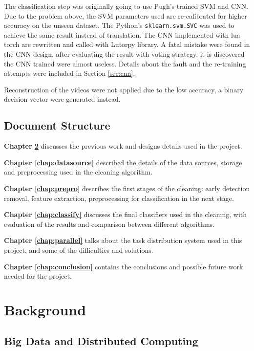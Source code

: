 \documentclass[bsc,logo,twoside,fullspacing,parskip]{infthesis}
\begin{document}
The classification step was originally going to use Pugh's trained SVM and CNN. Due to the problem above, the SVM parameters used are re-calibrated for higher accuracy on the unseen dataset. 
The Python's {\tt sklearn.svm.SVC} was used to achieve the same result instead of translation. The CNN implemented with lua torch are rewritten and called with Lutorpy library.
A fatal mistake were found in the CNN design, after evaluating the result with voting strategy, it is discovered the CNN trained were almost useless. Details about the fault and the re-training attempts were included in Section \ref{sec:cnn}.

Reconstruction of the videos were not applied due to the low accuracy, a binary decision vector were generated instead.

\section{Document Structure}

\textbf{Chapter \ref{chap:bg}} discusses the previous work and designs details used in the project. 

\textbf{Chapter \ref{chap:datasource}} described the details of the data sources, storage and preprocessing used in the cleaning algorithm.

\textbf{Chapter \ref{chap:prepro}} describes the first stages of the cleaning: early detection removal, feature extraction, preprocessing for classification in the next stage.

\textbf{Chapter \ref{chap:classify}} discusses the final classifiers used in the cleaning, with evaluation of the results and comparison between different algorithms. 


\textbf{Chapter \ref{chap:parallel}} talks about the task distribution system used in this project, and some of the difficulties and solutions.

\textbf{Chapter \ref{chap:conclusion}} contains the conclusions and possible future work needed for the project.
\newpage


\chapter{Background}
\label{chap:bg}

\section{Big Data and Distributed Computing}
\end{document}

